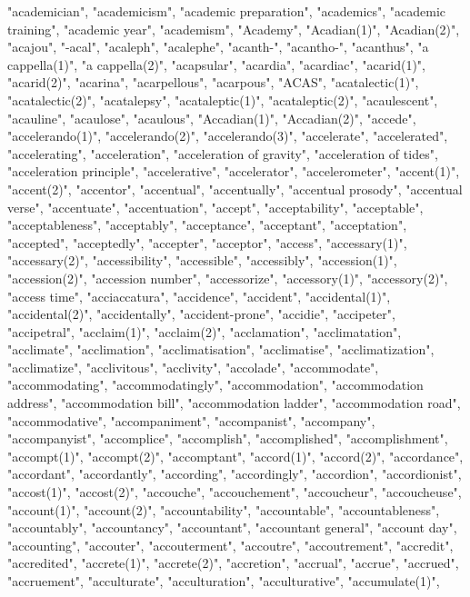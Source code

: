 "academician",
"academicism",
"academic preparation",
"academics",
"academic training",
"academic year",
"academism",
"Academy",
"Acadian(1)",
"Acadian(2)",
"acajou",
"-acal",
"acaleph",
"acalephe",
"acanth-",
"acantho-",
"acanthus",
"a cappella(1)",
"a cappella(2)",
"acapsular",
"acardia",
"acardiac",
"acarid(1)",
"acarid(2)",
"acarina",
"acarpellous",
"acarpous",
"ACAS",
"acatalectic(1)",
"acatalectic(2)",
"acatalepsy",
"acataleptic(1)",
"acataleptic(2)",
"acaulescent",
"acauline",
"acaulose",
"acaulous",
"Accadian(1)",
"Accadian(2)",
"accede",
"accelerando(1)",
"accelerando(2)",
"accelerando(3)",
"accelerate",
"accelerated",
"accelerating",
"acceleration",
"acceleration of gravity",
"acceleration of tides",
"acceleration principle",
"accelerative",
"accelerator",
"accelerometer",
"accent(1)",
"accent(2)",
"accentor",
"accentual",
"accentually",
"accentual prosody",
"accentual verse",
"accentuate",
"accentuation",
"accept",
"acceptability",
"acceptable",
"acceptableness",
"acceptably",
"acceptance",
"acceptant",
"acceptation",
"accepted",
"acceptedly",
"accepter",
"acceptor",
"access",
"accessary(1)",
"accessary(2)",
"accessibility",
"accessible",
"accessibly",
"accession(1)",
"accession(2)",
"accession number",
"accessorize",
"accessory(1)",
"accessory(2)",
"access time",
"acciaccatura",
"accidence",
"accident",
"accidental(1)",
"accidental(2)",
"accidentally",
"accident-prone",
"accidie",
"accipeter",
"accipetral",
"acclaim(1)",
"acclaim(2)",
"acclamation",
"acclimatation",
"acclimate",
"acclimation",
"acclimatisation",
"acclimatise",
"acclimatization",
"acclimatize",
"acclivitous",
"acclivity",
"accolade",
"accommodate",
"accommodating",
"accommodatingly",
"accommodation",
"accommodation address",
"accommodation bill",
"accommodation ladder",
"accommodation road",
"accommodative",
"accompaniment",
"accompanist",
"accompany",
"accompanyist",
"accomplice",
"accomplish",
"accomplished",
"accomplishment",
"accompt(1)",
"accompt(2)",
"accomptant",
"accord(1)",
"accord(2)",
"accordance",
"accordant",
"accordantly",
"according",
"accordingly",
"accordion",
"accordionist",
"accost(1)",
"accost(2)",
"accouche",
"accouchement",
"accoucheur",
"accoucheuse",
"account(1)",
"account(2)",
"accountability",
"accountable",
"accountableness",
"accountably",
"accountancy",
"accountant",
"accountant general",
"account day",
"accounting",
"accouter",
"accouterment",
"accoutre",
"accoutrement",
"accredit",
"accredited",
"accrete(1)",
"accrete(2)",
"accretion",
"accrual",
"accrue",
"accrued",
"accruement",
"acculturate",
"acculturation",
"acculturative",
"accumulate(1)",
